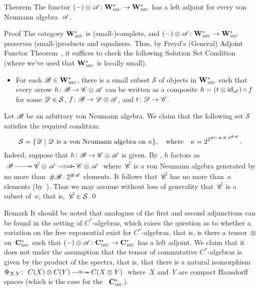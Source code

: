 \documentclass[a]{subfiles}
\begin{document}
\begin{parsec}
\begin{point}{Theorem}%
The functor $(-)\otimes\mathscr{A}\colon\mathbf{W}^*_{\text{\textsc{miu}}}\to\mathbf{W}^*_{\text{\textsc{miu}}}$
has a left adjoint
for every von Neumann algebra~$\mathscr{A}$.
\begin{point}{Proof}%
	The category $\mathbf{W}^*_{\text{\textsc{miu}}}$ is (small-)complete,
and
$(-)\otimes\mathscr{A}\colon\mathbf{W}^*_{\text{\textsc{miu}}}\to\mathbf{W}^*_{\text{\textsc{miu}}}$
preserves (small-)products and equalisers.
Thus,
by Freyd's (General)
Adjoint Functor Theorem~\cite[Thm.~V.6.2]{maclane1978},
it suffices to check the following Solution Set Condition
(where we've used that $\mathbf{W}^*_{\text{\textsc{miu}}}$
is locally small).
\begin{itemize}
\item
	For each $\mathscr{B}\in\mathbf{W}^*_{\text{\textsc{miu}}}$, there is a small subset $\mathcal{S}$ of objects in $\mathbf{W}^*_{\text{\textsc{miu}}}$
such that every arrow $h\colon \mathscr{B}\to\mathscr{C}\otimes\mathscr{A}$
can be written as a composite $h=(t\otimes\operatorname{id}_{\mathscr{A}})\circ f$ for some $\mathscr{D}\in \mathcal{S}$,
$f\colon\mathscr{B}\to\mathscr{D}\otimes \mathscr{A}$, and $t\colon \mathscr{D}\to\mathscr{C}$.
\end{itemize}
Let $\mathscr{B}$ be an arbitrary von Neumann algebra.
We claim that the following set $\mathcal{S}$ satisfies the required condition:
\[
	\mathcal{S}=
\{\mathscr{D}\mid
\text{$\mathscr{D}$ is a von Neumann algebra on~$\kappa$}\},
\quad\text{where}\quad\kappa=2^{2^{\#\mathbb{C}\cdot\#\mathscr{B}\cdot2^{\#\mathscr{A}}}}.
\]
Indeed,
suppose that $h\colon \mathscr{B}\to\mathscr{C}\otimes\mathscr{A}$ is given.
By ,
$h$ factors
as~$\xymatrix{\scrB\ar[r] & \tilde\scrC\otimes 
\scrA\ar[r]|-{\iota\otimes \id} & \scrC\otimes\scrA }$
where~$\tilde{\mathscr{C}}$
is a von Neumann algebra
generated by no more than~$\#\mathscr{B}\cdot2^{\#\mathscr{A}}$
elements.
It follows that~$\tilde{\mathscr{C}}$ has no
more than~$\kappa$ elements (by~).
Thus we may assume without loss of generality
that~$\tilde{\mathscr{C}}$
is a subset of~$\kappa$,
that is,~$\tilde{\mathscr{C}}\in\mathcal{S}$.\qed
\end{point}
\end{point}
\begin{point}{Remark}%
It should be noted that analogues
of the first and second adjunctions
can be found in the setting of $C^*$-algebras,
which raises the question as to whether
a variation on the free exponential exist for $C^*$-algebras,
that is, is there a tensor~$\otimes$ on~$\mathbf{C}^*_{\text{\textsc{miu}}}$
such that $(-)\otimes \mathscr{A}\colon
\mathbf{C}^*_{\text{\textsc{miu}}}\to\mathbf{C}^*_{\text{\textsc{miu}}}$
has a left adjoint.
We claim that it does not under the assumption
that the tensor of commutative
$C^*$-algebras is given by the product of the spectra,
that is,
that there is a natural isomorphism
$\Phi_{X,Y}\colon 
\smash{\xymatrix{
C(X)\otimes C(Y)
\ar[r]|-{\cong}
&
C(X\otimes Y)}}$ where~$X$ and~$Y$ are compact Hausdorff spaces
(which is the case for the ~$\mathbf{C}^*_{\text{\textsc{miu}}}$).

\end{point}
\end{parsec}
\end{document}
